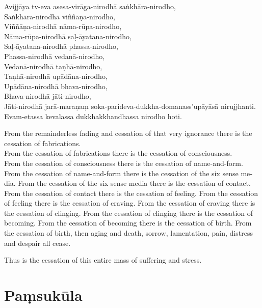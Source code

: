 Avijjāya tv-eva asesa-virāga-nirodhā saṅkhāra-nirodho,\\
Saṅkhāra-nirodhā viññāṇa-nirodho,\\
Viññāṇa-nirodhā nāma-rūpa-nirodho,\\
Nāma-rūpa-nirodhā saḷ-āyatana-nirodho,\\
Saḷ-āyatana-nirodhā phassa-nirodho,\\
Phassa-nirodhā vedanā-nirodho,\\
Vedanā-nirodhā taṇhā-nirodho,\\
Taṇhā-nirodhā upādāna-nirodho,\\
Upādāna-nirodhā bhava-nirodho,\\
Bhava-nirodhā jāti-nirodho,\\
Jāti-nirodhā jarā-maraṇaṃ soka-parideva-dukkha-domanass'upāyāsā nirujjhanti.\\
Evam-etassa kevalassa dukkhakkhandhassa nirodho hoti.

\begin{english}
  From the remainderless fading and cessation of that very ignorance there is the
  cessation of fabrications.\\
From the cessation of fabrications there is the cessation of consciousness.\\
From the cessation of consciousness there is the cessation of name-and-form.
From the cessation of name-and-form there is the cessation of the six sense media.
From the cessation of the six sense media there is the cessation of contact.
From the cessation of contact there is the cessation of feeling.
From the cessation of feeling there is the cessation of craving.
From the cessation of craving there is the cessation of clinging.
From the cessation of clinging there is the cessation of becoming.
From the cessation of becoming there is the cessation of birth.
From the cessation of birth, then aging and death, sorrow, lamentation, pain,
  distress and despair all cease.

Thus is the cessation of this entire mass of suffering and stress.
\end{english}


\section{Paṃsukūla}



